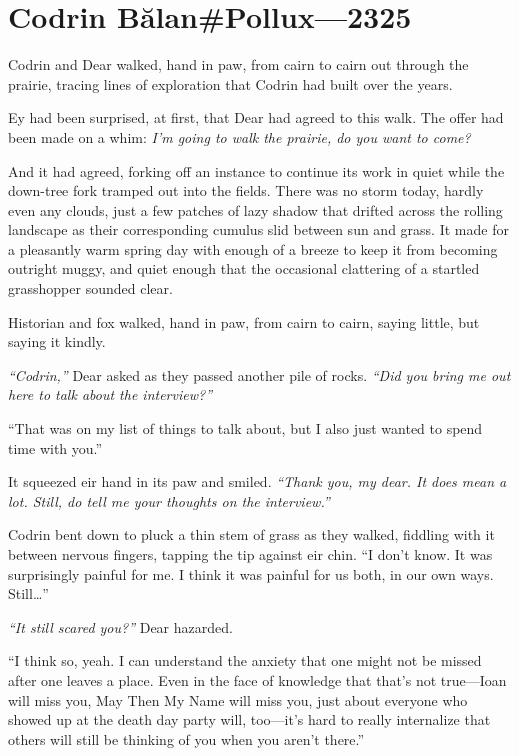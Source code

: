 \hypertarget{codrin-bux103lanpollux-2325}{%
\chapter{Codrin Bălan\#Pollux---2325}\label{codrin-bux103lanpollux-2325}}

Codrin and Dear walked, hand in paw, from cairn to cairn out through the prairie, tracing lines of exploration that Codrin had built over the years.

Ey had been surprised, at first, that Dear had agreed to this walk. The offer had been made on a whim: \emph{I'm going to walk the prairie, do you want to come?}

And it had agreed, forking off an instance to continue its work in quiet while the down-tree fork tramped out into the fields. There was no storm today, hardly even any clouds, just a few patches of lazy shadow that drifted across the rolling landscape as their corresponding cumulus slid between sun and grass. It made for a pleasantly warm spring day with enough of a breeze to keep it from becoming outright muggy, and quiet enough that the occasional clattering of a startled grasshopper sounded clear.

Historian and fox walked, hand in paw, from cairn to cairn, saying little, but saying it kindly.

\emph{``Codrin,''} Dear asked as they passed another pile of rocks. \emph{``Did you bring me out here to talk about the interview?''}

``That was on my list of things to talk about, but I also just wanted to spend time with you.''

It squeezed eir hand in its paw and smiled. \emph{``Thank you, my dear. It does mean a lot. Still, do tell me your thoughts on the interview.''}

Codrin bent down to pluck a thin stem of grass as they walked, fiddling with it between nervous fingers, tapping the tip against eir chin. ``I don't know. It was surprisingly painful for me. I think it was painful for us both, in our own ways. Still\ldots{}''

\emph{``It still scared you?''} Dear hazarded.

``I think so, yeah. I can understand the anxiety that one might not be missed after one leaves a place. Even in the face of knowledge that that's not true---Ioan will miss you, May Then My Name will miss you, just about everyone who showed up at the death day party will, too---it's hard to really internalize that others will still be thinking of you when you aren't there.''

